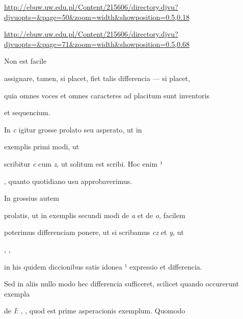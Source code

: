 
\newParkoszpage


{
\url{http://ebuw.uw.edu.pl/Content/215606/directory.djvu?djvuopts=&page=50&zoom=width&showposition=0.5,0.18}

\url{http://ebuw.uw.edu.pl/Content/215606/directory.djvu?djvuopts=&page=71&zoom=width&showposition=0.5,0.68}
}

\bigskip

\obeylines
\mono


\fullpreviouslines


{
\color{blue}
Non est facile 

assignare, tamen, si placet, fiet talis differencia — si placet,

}


\fulllines
quia omnes voces et omnes caracteres ad placitum sunt inventoris

\splitlines
et sequencium.

\indentK In \textit{c} igitur grosse prolato seu asperato, ut in

\fulllines

exemplis primi modi, ut     

scribitur \textit{c} cum \textit{z}, ut solitum est scribi. Hoc enim ¹ 

\splitlines

, quanto quotidiano usu approbaverimus.

\indentK In grossius autem

\fulllines

prolatis, ut in exemplis secundi modi de \textit{a} et de \textit{o}, facilem

poterimus differenciam ponere, ut si scribamus \textit{cz} et \textit{y}, ut 

,     ,

in his quidem diccionibus satis idonea ¹ expressio et differencia.

Sed in aliis nullo modo hec differencia sufficeret, scilicet quando occurerunt exempla

de \textit{I}: , , quod est prime asperacionis exemplum. Quomodo

